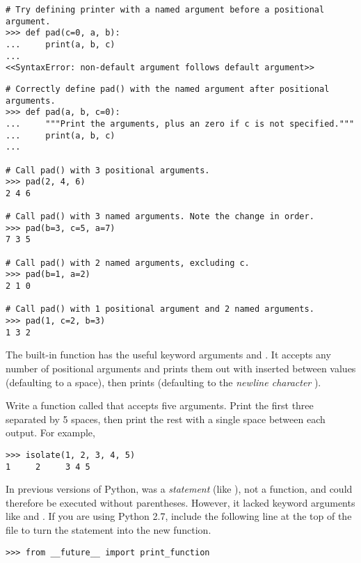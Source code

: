 \begin{lstlisting}
# Try defining printer with a named argument before a positional argument.
>>> def pad(c=0, a, b):
...     print(a, b, c)
...
<<SyntaxError: non-default argument follows default argument>>
\end{lstlisting} %
\begin{lstlisting}
# Correctly define pad() with the named argument after positional arguments.
>>> def pad(a, b, c=0):
...     """Print the arguments, plus an zero if c is not specified."""
...     print(a, b, c)
...

# Call pad() with 3 positional arguments.
>>> pad(2, 4, 6)
2 4 6

# Call pad() with 3 named arguments. Note the change in order.
>>> pad(b=3, c=5, a=7)
7 3 5

# Call pad() with 2 named arguments, excluding c.
>>> pad(b=1, a=2)
2 1 0

# Call pad() with 1 positional argument and 2 named arguments.
>>> pad(1, c=2, b=3)
1 3 2
\end{lstlisting}

\begin{problem}
The built-in  function has the useful keyword arguments  and .
It accepts any number of positional arguments and prints them out with  inserted between values (defaulting to a space), then prints  (defaulting to the \emph{newline character} ).

Write a function called  that accepts five arguments.
Print the first three separated by 5 spaces, then print the rest with a single space between each output.
For example,
\begin{lstlisting}
>>> isolate(1, 2, 3, 4, 5)
1     2     3 4 5
\end{lstlisting}
\end{problem}

\begin{warn} %
In previous versions of Python,  was a \emph{statement} (like ), not a function, and could therefore be executed without parentheses.
However, it lacked keyword arguments like  and .
If you are using Python 2.7, include the following line at the top of the file to turn the  statement into the new  function.
\begin{lstlisting}
>>> from __future__ import print_function
\end{lstlisting}
\end{warn}

